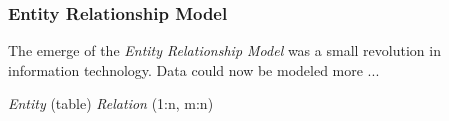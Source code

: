%
%
%
%
%
%
%

\subsubsection{Entity Relationship Model}
\label{entity_relationship_model_heading}

The emerge of the \emph{Entity Relationship Model} was a small revolution in
information technology. Data could now be modeled more ...

\emph{Entity} (table)
\emph{Relation} (1:n, m:n)
